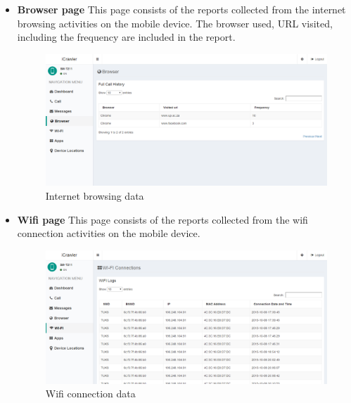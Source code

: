 \documentclass[hidelinks, 12pt, oneside]{article}
\begin{document}
\begin{itemize}
	 	 \item \textbf{Browser page}\newline
	 	This page consists of the reports collected from the internet browsing activities on the mobile device. The browser used, URL visited, including the frequency are included in the report.
	 	 
	 	 \begin{figure}[h!]
	 	 	\caption{Internet browsing data}
	 	 	\centering 																																		\includegraphics[width=1 \textwidth]{img/dashboard/dashboardBrowser.png}
	 	 \end{figure}\newpage	
	 	 
	 	 \item \textbf{Wifi page}\newline
	 	This page consists of the reports collected from the wifi connection activities on the mobile device. 
	 	 
	 	 \begin{figure}[h!]
	 	 	\caption{Wifi connection data}
	 	 	\centering 																																		\includegraphics[width=1 \textwidth]{img/dashboard/dashboardWifi.png}
	 	 \end{figure}\newpage
	 	 

\end{itemize}
\end{document}
